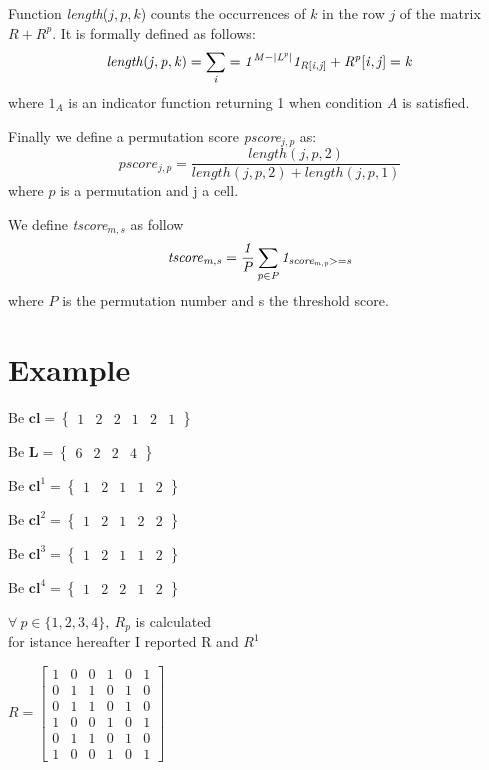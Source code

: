 \documentclass[12pt]{article}
\begin{document}
Function \emph{length}($j,p,k$) counts  the occurrences of $k$ in the row $j$ of the matrix  
 $R + R^p$. It is formally defined as follows:
  \[
   \it{length}(j,p,k)=\sum_i=1^{M-|L^p|} 1_{R[i,j]} + R^p[i,j]=k
   \]
where $1_A$ is an indicator function returning 1 when condition $A$ is satisfied.

Finally we define a permutation score \emph{pscore}$_{j,p}$ as:
  $$pscore_{j,p}= \frac{ length(j,p,2)}{length(j,p,2)+length(j,p,1)}$$ 
where $p$ is a permutation and j a cell.

We define \emph{tscore}$_{m,s}$ as follow  
$$
\it{tscore}_{m,s}= \frac{1}{P} \sum_{p\in P} 1_{\emph{score}_{m,p}>=s}
$$
where $P$ is the permutation number and s the threshold score.

\section{Example}

Be $\textbf{cl}= \begin{Bmatrix}
 1 & 2 & 2 & 1 & 2 & 1
\end{Bmatrix}  $

Be $\textbf{L}= \begin{Bmatrix}
 6 & 2 & 2 & 4  
\end{Bmatrix}  $

Be $\textbf{cl}^1= \begin{Bmatrix}
 1 & 2 & 1 & 1 & 2 
\end{Bmatrix}  $

Be $\textbf{cl}^2= \begin{Bmatrix}
 1 & 2 & 1 & 2 & 2 
\end{Bmatrix}  $

Be $\textbf{cl}^3= \begin{Bmatrix}
 1 & 2 & 1 & 1 & 2 
\end{Bmatrix}  $

Be $\textbf{cl}^4= \begin{Bmatrix}
 1 & 2 & 2 & 1 & 2 
\end{Bmatrix}  $

$\forall \ p \in \{1,2,3,4\}, \ R_p $ is calculated \\
for istance hereafter I reported R and $R^1$
 

$ R=\begin{bmatrix}
1 & 0 & 0 & 1 & 0 & 1 \\
0 & 1 & 1 & 0 & 1 & 0\\
0 & 1 & 1 & 0 & 1 & 0\\
1 & 0 & 0 & 1 & 0 & 1\\
0 & 1 & 1 & 0 & 1 & 0\\
1 & 0 & 0 & 1 & 0 & 1
\end{bmatrix}  $
\end{document}
